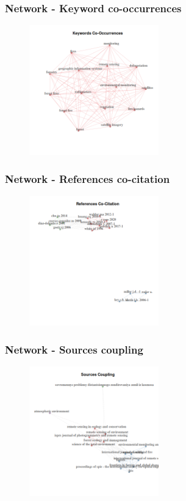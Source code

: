 \documentclass[aspectratio=169]{beamer}
\begin{document}
\begin{frame}
	\frametitle{Network - Keyword co-occurrences}
	\begin{figure}
		\centering
		\includegraphics[width=0.5\textwidth]
		{figures/bnet_keywords_co-occurrences.png}
	\end{figure}
\end{frame}

\begin{frame}
	\frametitle{Network - References co-citation}
	\begin{figure}
		\centering
		\includegraphics[width=0.5\textwidth]
		{figures/bnet_references_co-citation.png}
	\end{figure}
\end{frame}

\begin{frame}
	\frametitle{Network - Sources coupling}
	\begin{figure}
		\centering
		\includegraphics[width=0.5\textwidth]
		{figures/bnet_sources_coupling.png}
	\end{figure}
\end{frame}
\end{document}

